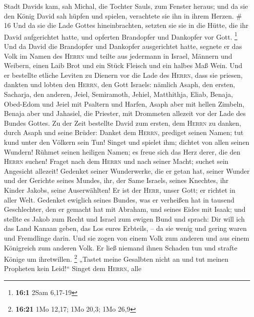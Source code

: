 Stadt Davids kam, sah Michal, die Tochter Sauls, zum Fenster heraus; und
da sie den König David sah hüpfen und spielen, verachtete sie ihn in
ihrem Herzen. \# 16  Und da sie die Lade Gottes
hineinbrachten, setzten sie sie in die Hütte, die ihr David aufgerichtet
hatte, und opferten Brandopfer und Dankopfer vor Gott. \footnote{\textbf{16:1}
  2Sam 6,17-19}  Und da David die Brandopfer und Dankopfer
ausgerichtet hatte, segnete er das Volk im Namen des \textsc{Herrn}
 und teilte aus jedermann in Israel, Männern und Weibern,
einen Laib Brot und ein Stück Fleisch und ein halbes Maß Wein.
 Und er bestellte etliche Leviten zu Dienern vor die Lade
des \textsc{Herrn}, dass sie priesen, dankten und lobten den
\textsc{Herrn}, den Gott Israels:  nämlich Asaph, den
ersten, Sacharja, den anderen, Jeiel, Semiramoth, Jehiel, Matthithja,
Eliab, Benaja, Obed-Edom und Jeiel mit Psaltern und Harfen, Asaph aber
mit hellen Zimbeln,  Benaja aber und Jahasiel, die
Priester, mit Drommeten allezeit vor der Lade des Bundes Gottes.
 Zu der Zeit bestellte David zum ersten, dem
\textsc{Herrn} zu danken, durch Asaph und seine Brüder: 
Danket dem \textsc{Herrn}, prediget seinen Namen; tut kund unter den
Völkern sein Tun!  Singet und spielet ihm; dichtet von
allen seinen Wundern!  Rühmet seinen heiligen Namen; es
freue sich das Herz derer, die den \textsc{Herrn} suchen!
 Fraget nach dem \textsc{Herrn} und nach seiner Macht;
suchet sein Angesicht allezeit!  Gedenket seiner
Wunderwerke, die er getan hat, seiner Wunder und der Gerichte seines
Mundes,  ihr, der Same Israels, seines Knechtes, ihr
Kinder Jakobs, seine Auserwählten!  Er ist der
\textsc{Herr}, unser Gott; er richtet in aller Welt. 
Gedenket ewiglich seines Bundes, was er verheißen hat in tausend
Geschlechter,  den er gemacht hat mit Abraham, und seines
Eides mit Isaak;  und stellte es Jakob zum Recht und
Israel zum ewigen Bund  und sprach: Dir will ich das Land
Kanaan geben, das Los eures Erbteils, --  da sie wenig
und gering waren und Fremdlinge darin.  Und sie zogen von
einem Volk zum anderen und aus einem Königreich zum anderen Volk.
 Er ließ niemand ihnen Schaden tun und strafte Könige um
ihretwillen. \footnote{\textbf{16:21} 1Mo 12,17; 1Mo 20,3; 1Mo 26,9}
 „Tastet meine Gesalbten nicht an und tut meinen
Propheten kein Leid!{}``  Singet dem \textsc{Herrn}, alle
